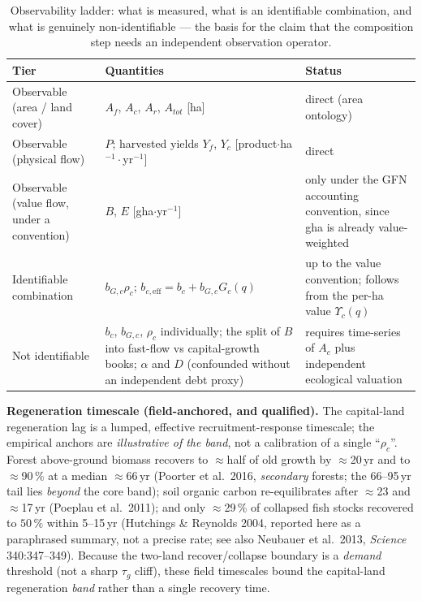 \documentclass[11pt]{article}
\begin{document}
\begin{table}[htbp]
\centering
\small
\begin{tabularx}{\textwidth}{>{\raggedright\arraybackslash}X>{\raggedright\arraybackslash}X>{\raggedright\arraybackslash}X}
\toprule
Tier & Quantities & Status \\
\midrule
Observable (area / land cover) & $A_f$, $A_c$, $A_r$, $A_{tot}$ [ha] & direct (area ontology) \\
Observable (physical flow) & $P$; harvested yields $Y_f$, $Y_c$ [product$\cdot$ha$^{-1}\cdot$yr$^{-1}$] & direct \\
Observable (value flow, under a convention) & $B$, $E$ [gha$\cdot$yr$^{-1}$] & only under the GFN accounting convention, since gha is already value-weighted \\
Identifiable combination & $b_{G,c}\rho_c$; $b_{c,\mathrm{eff}}=b_c+b_{G,c}G_c(q)$ & up to the value convention; follows from the per-ha value $\Upsilon_c(q)$ \\
Not identifiable & $b_c$, $b_{G,c}$, $\rho_c$ individually; the split of $B$ into fast-flow vs capital-growth books; $\alpha$ and $D$ (confounded without an independent debt proxy) & requires time-series of $A_c$ plus independent ecological valuation \\
\bottomrule
\end{tabularx}
\caption{Observability ladder: what is measured, what is an identifiable combination, and what is genuinely
non-identifiable --- the basis for the claim that the composition step needs an independent observation operator.}
\label{tab:ladder}
\end{table}

\noindent\textbf{Regeneration timescale (field-anchored, and qualified).} The capital-land regeneration lag is a lumped, effective recruitment-response timescale; the empirical anchors are \emph{illustrative of the band}, not a calibration of a single ``$\rho_c$''. Forest above-ground biomass recovers to $\approx$half of old growth by $\approx$20\,yr and to $\approx$90\,\% at a median $\approx$66\,yr (Poorter et al.\ 2016, \emph{secondary} forests; the 66--95\,yr tail lies \emph{beyond} the core band); soil organic carbon re-equilibrates after $\approx$23 and $\approx$17\,yr (Poeplau et al.\ 2011); and only $\approx$29\,\% of collapsed fish stocks recovered to $50\,\%$ within 5--15\,yr (Hutchings \& Reynolds 2004, reported here as a paraphrased summary, not a precise rate; see also Neubauer et al.\ 2013, \emph{Science} 340:347--349). Because the two-land recover/collapse boundary is a \emph{demand} threshold (not a sharp $\tau_g$ cliff), these field timescales bound the capital-land regeneration \emph{band} rather than a single recovery time.
\end{document}
